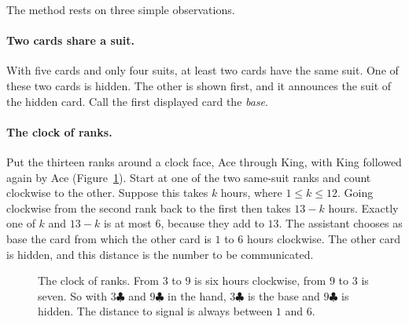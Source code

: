 \documentclass[11pt]{article}
\newcommand{\cl}{\ensuremath{\clubsuit}}
\begin{document}
The method rests on three simple observations.

\paragraph{Two cards share a suit.} 
With five cards and only four suits, at least two cards have the same suit. One of these two cards is hidden. The other is shown first, and it announces the suit of the hidden card.
Call the first displayed card the \emph{base}.

\paragraph{The clock of ranks.} Put the thirteen ranks around a clock face, Ace through King, with King followed again by Ace (Figure~\ref{fig:clock}). Start at one of the two same-suit ranks and count clockwise to the other. Suppose this takes $k$ hours, where $1\leq k\leq 12$. Going clockwise from the second rank back to the first then takes $13-k$ hours. Exactly one of $k$ and $13-k$ is at most $6$, because they add to $13$. The assistant chooses as base the card from which the other card is $1$ to $6$ hours clockwise. The other card is hidden, and this distance is the number to be communicated.


\begin{figure}[ht]
\centering
{}
\caption{The clock of ranks. From $3$ to $9$ is six hours clockwise, from $9$ to $3$
is seven. So with $3\cl$ and $9\cl$ in the hand, $3\cl$ is the base and $9\cl$ is
hidden. The distance to signal is always between $1$ and $6$.}
\label{fig:clock}
\end{figure}
\end{document}

